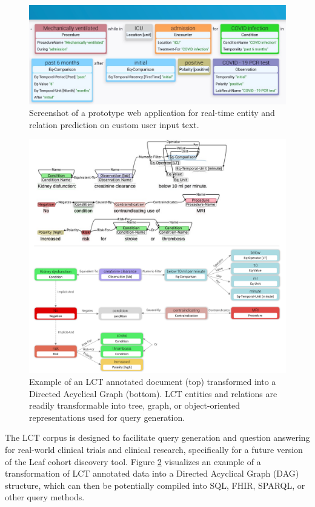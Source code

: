 \documentclass[../main.tex]{subfiles}
\begin{document}
\begin{figure}[p]
\centering
  \includegraphics[scale=0.6]{figs/leafai2.pdf}  
\caption{Screenshot of a prototype web application for real-time entity and relation prediction on custom user input text.}
\label{fig_leafai}
\end{figure}

\begin{figure}[p]
\centering
  \includegraphics[scale=0.64]{figs/dag.pdf}  
\caption{Example of an LCT annotated document (top) transformed into a Directed Acyclical Graph (bottom). LCT entities and relations are readily transformable into tree, graph, or object-oriented representations used for query generation.}
\label{fig_dag}
\end{figure}

The LCT corpus is designed to facilitate query generation and question answering for real-world clinical trials and clinical research, specifically for a future version of the Leaf cohort discovery tool\cite{dobbins2019leaf}. Figure \ref{fig_dag} visualizes an example of a transformation of LCT annotated data into a Directed Acyclical Graph (DAG) structure, which can then be potentially compiled into SQL, FHIR, SPARQL, or other query methods. \\
\end{document}
